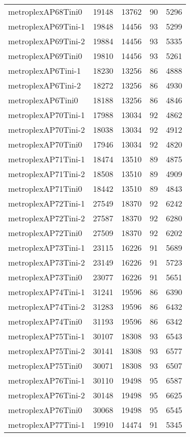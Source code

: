 \begin{longtable}{lrrrr}
metroplexAP68Tini0 & 19148 & 13762 & 90 & 5296 \\
metroplexAP69Tini-1 & 19848 & 14456 & 93 & 5299 \\
metroplexAP69Tini-2 & 19884 & 14456 & 93 & 5335 \\
metroplexAP69Tini0 & 19810 & 14456 & 93 & 5261 \\
metroplexAP6Tini-1 & 18230 & 13256 & 86 & 4888 \\
metroplexAP6Tini-2 & 18272 & 13256 & 86 & 4930 \\
metroplexAP6Tini0 & 18188 & 13256 & 86 & 4846 \\
metroplexAP70Tini-1 & 17988 & 13034 & 92 & 4862 \\
metroplexAP70Tini-2 & 18038 & 13034 & 92 & 4912 \\
metroplexAP70Tini0 & 17946 & 13034 & 92 & 4820 \\
metroplexAP71Tini-1 & 18474 & 13510 & 89 & 4875 \\
metroplexAP71Tini-2 & 18508 & 13510 & 89 & 4909 \\
metroplexAP71Tini0 & 18442 & 13510 & 89 & 4843 \\
metroplexAP72Tini-1 & 27549 & 18370 & 92 & 6242 \\
metroplexAP72Tini-2 & 27587 & 18370 & 92 & 6280 \\
metroplexAP72Tini0 & 27509 & 18370 & 92 & 6202 \\
metroplexAP73Tini-1 & 23115 & 16226 & 91 & 5689 \\
metroplexAP73Tini-2 & 23149 & 16226 & 91 & 5723 \\
metroplexAP73Tini0 & 23077 & 16226 & 91 & 5651 \\
metroplexAP74Tini-1 & 31241 & 19596 & 86 & 6390 \\
metroplexAP74Tini-2 & 31283 & 19596 & 86 & 6432 \\
metroplexAP74Tini0 & 31193 & 19596 & 86 & 6342 \\
metroplexAP75Tini-1 & 30107 & 18308 & 93 & 6543 \\
metroplexAP75Tini-2 & 30141 & 18308 & 93 & 6577 \\
metroplexAP75Tini0 & 30071 & 18308 & 93 & 6507 \\
metroplexAP76Tini-1 & 30110 & 19498 & 95 & 6587 \\
metroplexAP76Tini-2 & 30148 & 19498 & 95 & 6625 \\
metroplexAP76Tini0 & 30068 & 19498 & 95 & 6545 \\
metroplexAP77Tini-1 & 19910 & 14474 & 91 & 5345 \\

\end{longtable}
